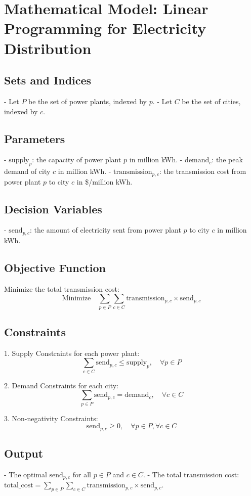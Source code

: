 \documentclass{article}
\begin{document}
\section*{Mathematical Model: Linear Programming for Electricity Distribution}

\subsection*{Sets and Indices}
- Let \( P \) be the set of power plants, indexed by \( p \).
- Let \( C \) be the set of cities, indexed by \( c \).

\subsection*{Parameters}
- \( \text{supply}_p \): the capacity of power plant \( p \) in million kWh.
- \( \text{demand}_c \): the peak demand of city \( c \) in million kWh.
- \( \text{transmission}_{p,c} \): the transmission cost from power plant \( p \) to city \( c \) in \$/million kWh.

\subsection*{Decision Variables}
- \( \text{send}_{p,c} \): the amount of electricity sent from power plant \( p \) to city \( c \) in million kWh.

\subsection*{Objective Function}
Minimize the total transmission cost:
\[
\text{Minimize} \quad \sum_{p \in P} \sum_{c \in C} \text{transmission}_{p,c} \times \text{send}_{p,c} 
\]

\subsection*{Constraints}
1. Supply Constraints for each power plant:
   \[
   \sum_{c \in C} \text{send}_{p,c} \leq \text{supply}_p, \quad \forall p \in P
   \]

2. Demand Constraints for each city:
   \[
   \sum_{p \in P} \text{send}_{p,c} = \text{demand}_c, \quad \forall c \in C
   \]

3. Non-negativity Constraints:
   \[
   \text{send}_{p,c} \geq 0, \quad \forall p \in P, \forall c \in C
   \]

\subsection*{Output}
- The optimal \( \text{send}_{p,c} \) for all \( p \in P \) and \( c \in C \).
- The total transmission cost: \( \text{total\_cost} = \sum_{p \in P} \sum_{c \in C} \text{transmission}_{p,c} \times \text{send}_{p,c} \).
\end{document}
